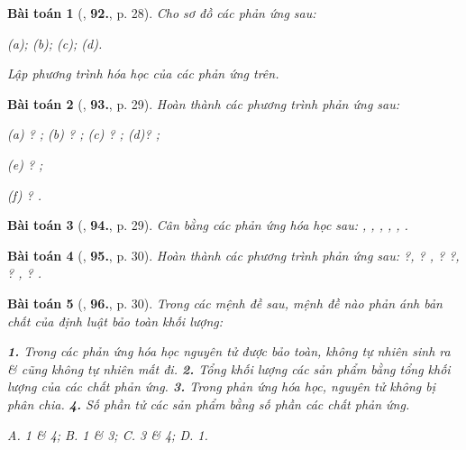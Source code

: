 \documentclass{article}
\numberwithin{equation}{section}
\newtheorem{baitoan}{Bài toán}
\begin{document}
\begin{baitoan}[\cite{An2011}, \textbf{92.}, p. 28]
	Cho sơ đồ các phản ứng sau:
	
		(a)\emph{};
		(b)\emph{};
		(c)\emph{};
		(d)\emph{}.
	
	Lập phương trình hóa học của các phản ứng trên.
\end{baitoan}

\begin{baitoan}[\cite{An2011}, \textbf{93.}, p. 29]
	Hoàn thành các phương trình phản ứng sau:
	
		(a)\emph{ ? };
		(b)\emph{ ? };
		(c)\emph{ ? };
		(d)\emph{? };
		\item[(e)] \emph{? };
		\item[(f)] \emph{ ? }.
	
\end{baitoan}

\begin{baitoan}[\cite{An2011}, \textbf{94.}, p. 29]
	Cân bằng các phản ứng hóa học sau: \emph{, , , , , }.
\end{baitoan}

\begin{baitoan}[\cite{An2011}, \textbf{95.}, p. 30]
	Hoàn thành các phương trình phản ứng sau: \emph{ ?,  ? ,  ?  ?,  ? ,  ? }.
\end{baitoan}

\begin{baitoan}[\cite{An2011}, \textbf{96.}, p. 30]
	Trong các mệnh đề sau, mệnh đề nào phản ánh bản chất của định luật bảo toàn khối lượng:
	
		{\bf 1.} Trong các phản ứng hóa học nguyên tử được bảo toàn, không tự nhiên sinh ra \& cũng không tự nhiên mất đi.
		{\bf 2.} Tổng khối lượng các sản phẩm bằng tổng khối lượng của các chất phản ứng.
		{\bf 3.} Trong phản ứng hóa học, nguyên tử không bị phân chia.
		{\bf 4.} Số phần tử các sản phẩm bằng số phần các chất phản ứng.
	
	
	
		{\sf A.} 1 \& 4;
		{\sf B.} 1 \& 3;
		{\sf C.} 3 \& 4;
		{\sf D.} 1.
	
\end{baitoan}
\end{document}
